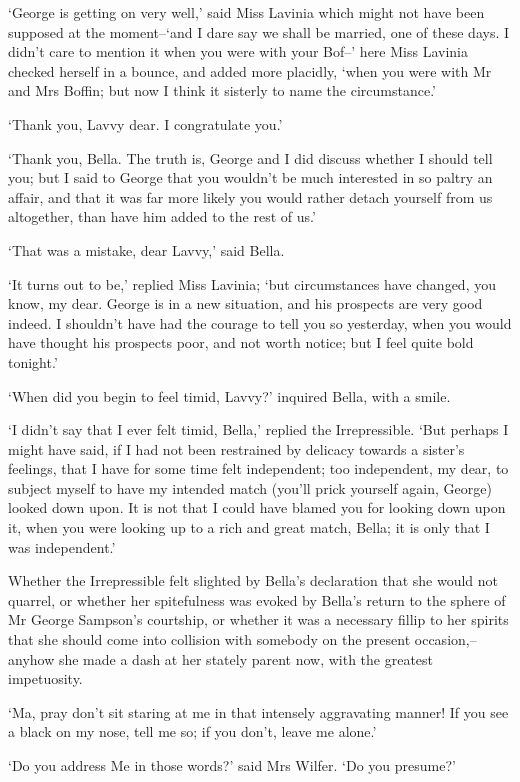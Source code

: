 ‘George is getting on very well,’ said Miss Lavinia which might not have
been supposed at the moment--‘and I dare say we shall be married, one of
these days. I didn’t care to mention it when you were with your Bof--’
here Miss Lavinia checked herself in a bounce, and added more placidly,
‘when you were with Mr and Mrs Boffin; but now I think it sisterly to
name the circumstance.’

‘Thank you, Lavvy dear. I congratulate you.’

‘Thank you, Bella. The truth is, George and I did discuss whether
I should tell you; but I said to George that you wouldn’t be much
interested in so paltry an affair, and that it was far more likely you
would rather detach yourself from us altogether, than have him added to
the rest of us.’

‘That was a mistake, dear Lavvy,’ said Bella.

‘It turns out to be,’ replied Miss Lavinia; ‘but circumstances have
changed, you know, my dear. George is in a new situation, and his
prospects are very good indeed. I shouldn’t have had the courage to tell
you so yesterday, when you would have thought his prospects poor, and
not worth notice; but I feel quite bold tonight.’

‘When did you begin to feel timid, Lavvy?’ inquired Bella, with a smile.

‘I didn’t say that I ever felt timid, Bella,’ replied the Irrepressible.
‘But perhaps I might have said, if I had not been restrained by delicacy
towards a sister’s feelings, that I have for some time felt independent;
too independent, my dear, to subject myself to have my intended match
(you’ll prick yourself again, George) looked down upon. It is not that I
could have blamed you for looking down upon it, when you were looking up
to a rich and great match, Bella; it is only that I was independent.’

Whether the Irrepressible felt slighted by Bella’s declaration that she
would not quarrel, or whether her spitefulness was evoked by Bella’s
return to the sphere of Mr George Sampson’s courtship, or whether it was
a necessary fillip to her spirits that she should come into collision
with somebody on the present occasion,--anyhow she made a dash at her
stately parent now, with the greatest impetuosity.

‘Ma, pray don’t sit staring at me in that intensely aggravating manner!
If you see a black on my nose, tell me so; if you don’t, leave me
alone.’

‘Do you address Me in those words?’ said Mrs Wilfer. ‘Do you presume?’

